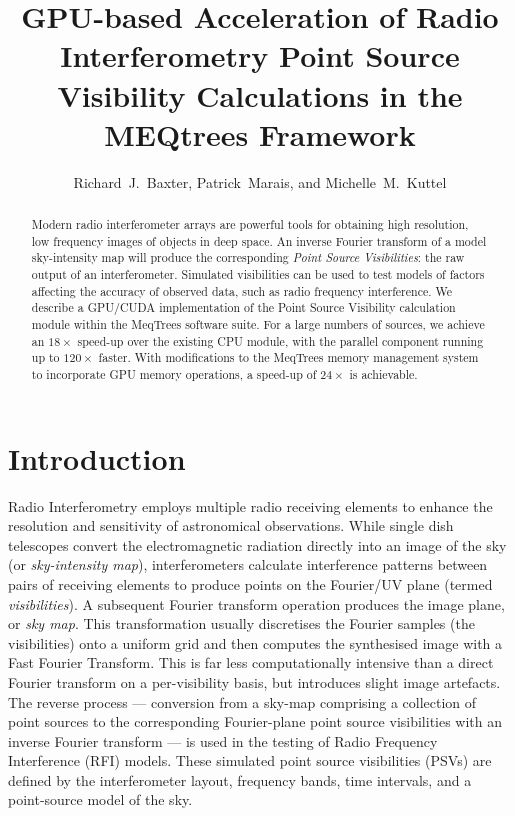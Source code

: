 
\resetcounters






\title{GPU-based Acceleration of Radio Interferometry Point Source
Visibility Calculations in the MEQtrees Framework} 

\author{Richard~J.~Baxter, Patrick~Marais, and Michelle~M.~Kuttel
}

\begin{abstract}
  
Modern radio interferometer arrays are powerful tools for obtaining high
resolution, low frequency images of objects in deep space. An inverse Fourier
transform of a model sky-intensity map will produce the corresponding
\emph{Point Source Visibilities}:  the raw output of an interferometer.
Simulated visibilities can be used to test models of factors affecting the
accuracy of observed data, such as radio frequency interference. We describe a
GPU/CUDA implementation of the Point Source Visibility calculation module
within the MeqTrees software suite.  For a large numbers of sources, we
achieve an $18\times$ speed-up over the existing CPU module, with the parallel
component running up to $120\times$ faster. With modifications to the MeqTrees
memory management system to incorporate GPU memory operations, a speed-up of
$24\times$ is achievable.

\end{abstract}


\section{Introduction}

Radio Interferometry employs multiple radio receiving elements  to enhance the
resolution and sensitivity of astronomical observations. While single dish
telescopes convert the electromagnetic radiation directly into an image of the
sky (or \emph{sky-intensity map}), interferometers calculate interference
patterns between pairs of receiving elements to produce points on the
Fourier/UV plane (termed \emph{visibilities}).  A subsequent Fourier transform
operation produces the image plane, or \emph{sky map}. This transformation
usually discretises the Fourier samples (the visibilities) onto a uniform grid
and then computes the synthesised image with a Fast Fourier Transform.  This
is far less computationally intensive than a direct Fourier transform on a
per-visibility basis, but introduces slight image artefacts.  The reverse
process --- conversion from a sky-map comprising a collection of point sources
to the corresponding Fourier-plane point source visibilities  with an inverse
Fourier transform --- is used in the testing of Radio Frequency Interference
(RFI) models.  These simulated point source visibilities (PSVs) are defined by
the interferometer layout, frequency bands, time intervals, and a point-source
model of the sky.


